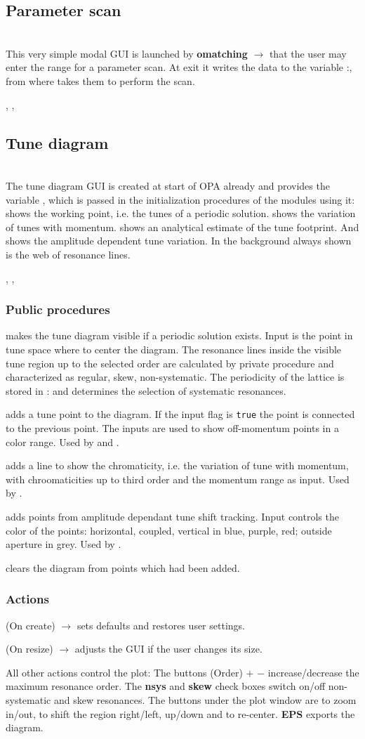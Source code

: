 \documentclass[12pt]{article}
\newcommand\code[1]{{\tt #1}}
\newcommand{\ofld}[1]{\colorbox{black!15}{{{\color{black}\bf #1}}}}
\newcommand{\ofldx}[1]{\colorbox{black!15}{{\color{black}(#1)}}}
\newcommand\guico[1]{{\color{blue}\code{#1}}}
\newcommand{\unico}[1]{{\color{burntorange}\code{#1}}}
\newcommand{\evcod}[2]{\ofld{#1} $\rightarrow$ \guico{#2}}
\newcommand{\evcodx}[2]{\ofldx{#1} $\rightarrow$ \guico{#2}}
\newcommand{\vrcod}[2]{\opauni{#1}:\unico{#2}}
\newcommand{\opagui}[1]{\colorbox{blue!20}{{\color{black}\code{#1}}}}
\newcommand{\oguih}[2]{\subsection{\label{#2}#1}{\Huge\opagui{#2}}\\}
\newcommand{\ogui}[1]{\hyperref[#1]{\opagui{#1}}}
\newcommand{\opaguif}[1]{\colorbox{violet!30}{{\color{black}\code{#1}}}}
\newcommand{\oguif}[1]{\hyperref[#1]{\opaguif{#1}}}
\newcommand{\opauni}[1]{\colorbox{orange!30}{{\color{black}\code{#1}}}}
\newcommand{\ouni}[1]{\hyperref[#1]{\opauni{#1}}}
\newcommand{\uses}[1]{\flushleft {\bf Uses:} #1}
\newcommand{\desc}[1]{#1}
\newcommand{\act}[1]{\subsubsection*{Actions} #1}
\newcommand{\ppro}[1]{\subsubsection*{Public procedures} #1}
\begin{document}
\oguih{Parameter scan}{omatchscan}

\desc{This very simple modal GUI is launched by \evcod{omatching}{ScanClick} that the user may enter the range for a parameter scan. At exit it writes the data to the variable \vrcod{linoplib}{ScanPar}, from where \ogui{omatching} takes them to perform the scan.}

\uses{\ouni{linoplib}, \ouni{globlib}, \ouni{../com/asaux}} 


\oguih{Tune diagram}{opatunediag}

\desc{The tune diagram GUI is created at start of OPA already and provides the variable \guico{tuneplot}, which is passed in the initialization procedures of the modules using it: \ogui{opalinop} shows the working point, i.e. the tunes of a periodic solution. \ogui{opamomentum} shows the variation of tunes with momentum. \ogui{opachroma} shows an analytical estimate of the tune footprint. And \ogui{opatrackps} shows the amplitude dependent tune variation. In the background always shown is the web of resonance lines.}

\uses{\ouni{globlib}, \oguif{../com/asfigure}, \ouni{../com/asaux}}

\ppro{
\guico{Diagram} makes the tune diagram visible if a periodic solution exists. Input is the point in tune space where to center the diagram.  The resonance lines inside the visible tune region up to the selected order are calculated by private procedure \unico{getLines} and characterized as regular, skew, non-systematic.  The periodicity of the lattice is stored in \vrcod{globlib}{NPer} and determines the selection of systematic resonances. 

\guico{AddTunePoint} adds a tune point to the diagram. If the input flag \guico{connect} is \code{true} the point is connected to the previous point. The inputs \guico{dpp, dppmax} are used to show off-momentum points in a color range. Used by \ogui{opalinop} and \ogui{opamomentum}.

\guico{AddChromLine} adds a line to show the chromaticity, i.e. the variation of tune with momentum, with chroomaticities up to third order and the momentum range as input. Used by \ogui{opachroma}.

\guico{AddTushPoint} adds points from amplitude dependant tune shift tracking. Input \guico{xmy} controls the color of the points: horizontal, coupled, vertical in blue, purple, red; outside aperture in grey. Used by \ogui{opatrackps}.

\guico{Refresh} clears the diagram from points which had been added.
}
\act{
\evcodx{On create}{FormCreate} sets defaults and restores user settings.

\evcodx{On resize}{FormResize} adjusts the GUI if the user changes its size.

All other actions control the plot: The buttons \ofldx{Order} \ofld{$+$} \ofld{$-$} increase/decrease the maximum resonance order. The \ofld{nsys} and \ofld{skew} check boxes switch on/off non-systematic and skew resonances. The buttons under the plot window are to zoom in/out, to shift the region right/left, up/down and to re-center. \ofld{EPS} exports the diagram.
}
\end{document}
